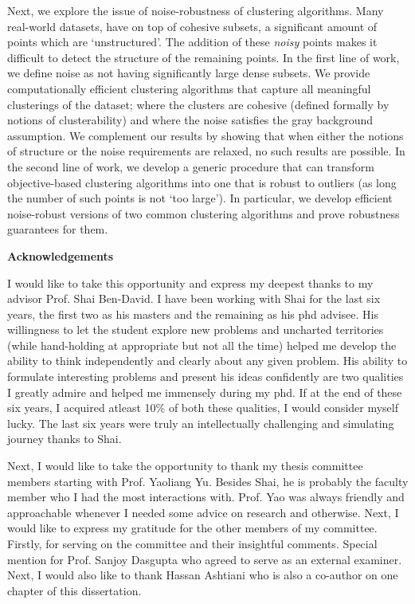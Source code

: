 \documentclass[letterpaper,12pt,titlepage,oneside,final]{book}
\let\origdoublepage\cleardoublepage
\newcommand{\clearemptydoublepage}{%
  \clearpage{\pagestyle{empty}\origdoublepage}}
\let\cleardoublepage\clearemptydoublepage
\begin{document}
Next, we explore the issue of noise-robustness of clustering algorithms. Many real-world datasets, have on top of cohesive subsets, a significant amount of points which are `unstructured'. The addition of these \textit{noisy} points makes it difficult to detect the structure of the remaining points. In the first line of work, we define noise as not having significantly large dense subsets. We provide computationally efficient clustering algorithms that capture all meaningful clusterings of the dataset; where the clusters are cohesive (defined formally by notions of clusterability) and where the noise satisfies the gray background assumption. We complement our results by showing that when either the notions of structure or the noise requirements are relaxed, no such results are possible. In the second line of work, we develop a generic procedure that can transform objective-based clustering algorithms into one that is robust to outliers (as long the number of such points is not `too large'). In particular, we develop efficient noise-robust versions of two common clustering algorithms and prove robustness guarantees for them. 

   

\cleardoublepage

\begin{center}\textbf{Acknowledgements}\end{center}

I would like to take this opportunity and express my deepest thanks to my advisor Prof. Shai Ben-David. I have been working with Shai for the last six years, the first two as his masters and the remaining as his phd advisee. His willingness to let the student explore new problems and uncharted territories (while hand-holding at appropriate but not all the time)  helped me develop the ability to think independently and clearly about any given problem. His ability to formulate interesting problems and present his ideas confidently are two qualities I greatly admire and helped me immensely during my phd. If at the end of these six years, I acquired atleast 10\% of both these qualities, I would consider myself lucky. The last six years were truly an intellectually challenging and simulating journey thanks to Shai.

Next, I would like to take the opportunity to thank my thesis committee members starting with Prof. Yaoliang Yu. Besides Shai, he is probably the faculty member who I had the most interactions with. Prof. Yao was always friendly and approachable whenever I needed some advice on research and otherwise. Next, I would like to express my gratitude for the other members of my committee. Firstly, for serving on the committee and their insightful comments. Special mention for Prof. Sanjoy Dasgupta who agreed to serve as an external examiner. Next, I would also like to thank Hassan Ashtiani who is also a co-author on one chapter of this dissertation. 
\end{document}
